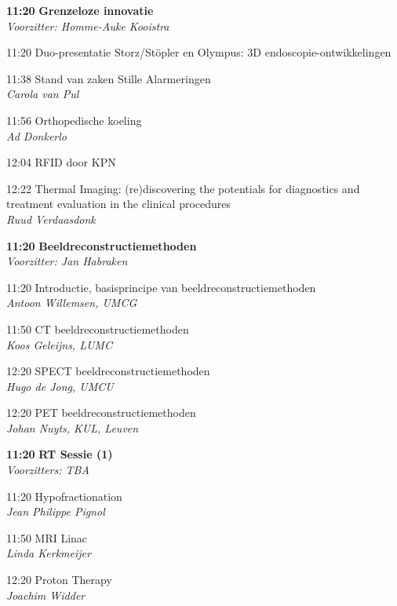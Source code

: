 \documentclass[a4paper,10pt]{report}
\begin{document}
\begin{multicols*}{3}
\vfill
{}
\begin{packed_enum}
\item[\textbf{11:20}]\textbf{Grenzeloze innovatie}\\\textit{Voorzitter: Homme-Auke Kooistra}
\item[11:20] Duo-presentatie Storz/St\"opler en Olympus: 3D endo\-sco\-pie-ontwikkelingen
\item[11:38] Stand van zaken Stille Alarmeringen\\\textit{Carola van Pul}
\item[11:56] Orthopedische koeling\\\textit{Ad Donkerlo}
\item[12:04] RFID door KPN
\item[12:22] Thermal Imaging: (re)discovering the potentials for diag\-nostics and treatment evaluation in the clinical procedures\\\textit{Ruud Verdaasdonk}
\end{packed_enum}
\columnbreak

\begin{packed_enum}
\item[\textbf{11:20}]\textbf{Beeldreconstructiemethoden}\\\textit{Voorzitter: Jan Habraken}
\item[11:20] Introductie, basisprincipe van beeldreconstructiemethoden\\\textit{Antoon Willemsen, UMCG}
\item[11:50] CT beeldreconstructiemethoden\\\textit{Koos Geleijns, LUMC}
\item[12:20] SPECT beeldreconstructiemethoden\\\textit{Hugo de Jong, UMCU}
\item[12:20] PET beeldreconstructiemethoden\\\textit{Johan Nuyts, KUL, Leuven}
\end{packed_enum}

\begin{packed_enum}
\item[\textbf{11:20}]{\textbf{RT Sessie (1)}}\\\textit{Voorzitters: TBA}
\item[11:20] Hypofractionation\\\textit{Jean Philippe Pignol}
\item[11:50] MRI Linac\\\textit{Linda Kerkmeijer}
\item[12:20] Proton Therapy\\\textit{Joachim Widder}
\end{packed_enum}


\end{multicols*}
\end{document}
